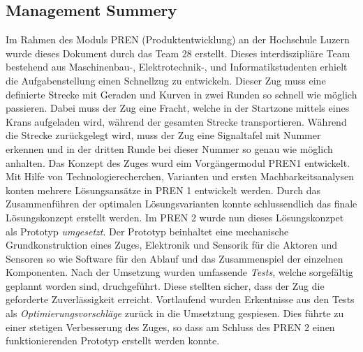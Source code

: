 \documentclass[../../main.tex]{subfiles}
\begin{document}
\subsection{Management Summery}
Im Rahmen des Moduls PREN (Produktentwicklung) an der Hochschule Luzern wurde dieses Dokument durch das Team 28
erstellt. Dieses interdiszipliäre Team bestehend aus Maschinenbau-, Elektrotechnik-, und Informatikstudenten erhielt die Aufgabenstellung einen Schnellzug zu entwickeln. Dieser Zug muss eine definierte Strecke mit Geraden und Kurven in zwei Runden so schnell wie möglich passieren. Dabei muss der Zug eine Fracht, welche in der Startzone mittels eines Krans aufgeladen wird, während der gesamten Strecke transportieren. Während die Strecke zurückgelegt wird, muss der Zug eine Signaltafel mit Nummer erkennen und in der dritten Runde bei dieser Nummer so genau wie möglich anhalten. Das Konzept des Zuges wurd eim Vorgängermodul PREN1 entwickelt. Mit Hilfe von Technologierecherchen, Varianten und ersten Machbarkeitsanalysen konten mehrere Lösungsansätze in PREN 1 entwickelt werden. Durch das Zusammenführen der optimalen Lösungsvarianten konnte schlussendlich das finale Lösungskonzept erstellt werden. Im PREN 2 wurde nun dieses Lösungskonzpet als Prototyp \textit{umgesetzt}. Der Prototyp beinhaltet eine mechanische Grundkonstruktion eines Zuges, Elektronik und Sensorik für die Aktoren und Sensoren so wie Software für den Ablauf und das Zusammenspiel der einzelnen Komponenten. Nach der Umsetzung wurden umfassende \textit{Tests}, welche sorgefältig geplannt worden sind, druchgeführt. Diese stellten sicher, dass der Zug die geforderte Zuverlässigkeit erreicht. Vortlaufend wurden Erkentnisse aus den Tests als \textit{Optimierungsvorschläge} zurück in die Umsetztung gespiesen. Dies führte zu einer stetigen Verbesserung des Zuges, so dass am Schluss des PREN 2 einen funktionierenden Prototyp erstellt werden konnte.
\end{document}
